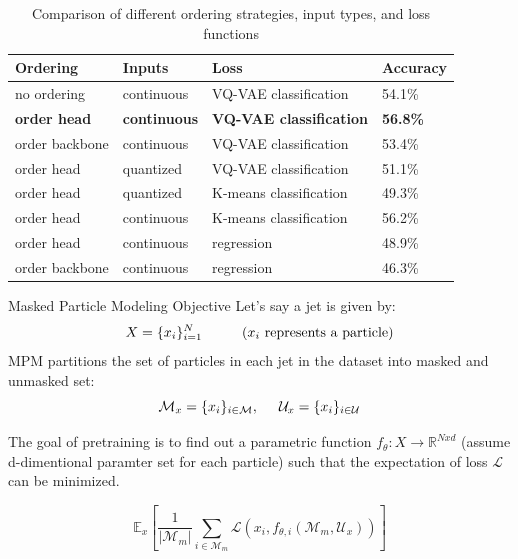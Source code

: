 \documentclass[10pt]{beamer}
\newcommand{\la}{\mathcal{L}}
\newcommand{\ma}{\mathcal{M}}
\newcommand{\ua}{\mathcal{U}}
\begin{document}
\begin{frame}
    \begin{table}
        \centering
        \begin{tabular}{|l|l|l|l|}
            \hline
        \textbf{Ordering} & \textbf{Inputs} & \textbf{Loss}& \textbf{Accuracy} \\
            \hline
            no ordering & continuous & VQ-VAE classification & 54.1\% \\
            \textbf{order head} & \textbf{continuous} & \textbf{VQ-VAE
            classification} & \textbf{56.8\%} \\
            order backbone & continuous & VQ-VAE classification & 53.4\% \\
            order head & quantized & VQ-VAE classification & 51.1\% \\
            order head & quantized & K-means classification & 49.3\% \\
            order head & continuous & K-means classification & 56.2\% \\
            order head & continuous & regression & 48.9\% \\
            order backbone & continuous & regression & 46.3\% \\
            \hline
        \end{tabular}
        \caption{Comparison of different ordering strategies, input types, and
        loss functions}
        \label{table:comparison}
    \end{table}
\end{frame}


\begin{frame}{Masked Particle Modeling Objective}
    Let's say a jet is given by:
    $$ X = \{x_i\}_{i=1}^{N} \text{\hspace{1cm}($x_i$ represents a particle)} $$
    MPM partitions the set of particles in each jet in the dataset into masked and unmasked
    set:
    $$ \ma_x = \{x_i\}_{i\in \ma}, \hspace{0.5cm} \ua_x = \{x_i\}_{i\in \ua}$$

    The goal of pretraining is to find out a parametric function $f_\theta: X \to
    \mathbb{R}^{Nxd}$ (assume d-dimentional paramter set for each particle) such that the expectation of loss $\la$ can be minimized.

    $$ \mathbb{E}_x \left[ \frac{1}{|\ma_m|} \sum_{i\in \ma_m} \la(x_i,
    f_{\theta,i}(\ma_m, \ua_x)) \right] $$

\end{frame}
\end{document}
